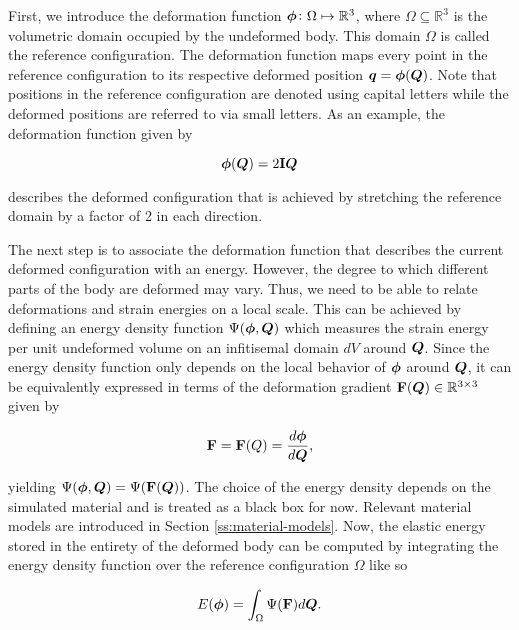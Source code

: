 First, we introduce the deformation function $\bm{\phi} \colon \Omega \mapsto \mathbb{R}^3$, where $\Omega \subseteq \mathbb{R}^3$ is the 
volumetric domain occupied by the undeformed body. This domain $\Omega$ is called the reference configuration. The deformation 
function maps every point in the reference configuration 
to its respective deformed position $\bm{q} = \bm{\phi}(\bm{Q})$. Note that positions in the reference configuration are denoted using capital 
letters while the deformed positions are referred to via small letters. As an example, the deformation function given by 

\[
    \bm{\phi}(\bm{Q}) = 2\mathbf{I}\bm{Q}
\]

\noindent describes the deformed configuration that is achieved by stretching the reference domain by a factor of 2 in each direction. 

The next step is to associate the deformation function that describes the current deformed configuration with an energy. However, the degree to 
which different parts of the body are deformed may vary. Thus, we need to be able to relate deformations and strain energies on a local scale. 
This can be achieved by defining an energy density function $\Psi(\bm{\phi}, \bm{Q})$ which measures the strain energy per unit undeformed volume 
on an infitisemal domain $dV$ around $\bm{Q}$. Since the energy density function only depends on the local behavior of $\bm{\phi}$ around 
$\bm{Q}$, it can be equivalently expressed in terms of the deformation gradient $\mathbf{F}(\bm{Q}) \in \mathbb{R}^{3 \times 3}$ given by 

\begin{equation}\label{eq:deformation-gradient}
    \mathbf{F} = \mathbf{F}(Q) = \frac{d\bm{\phi}}{d\bm{Q}},
\end{equation}

\noindent yielding $\Psi(\bm{\phi}, \bm{Q}) = \Psi(\mathbf{F}(\bm{Q}))$. The choice of the energy density depends on the simulated material and 
is treated as a black box for now. Relevant material models are introduced in Section \ref{ss:material-models}. Now, the elastic energy stored in the 
entirety of the deformed body can be computed by integrating the energy density function over the reference configuration $\Omega$ like so

\begin{equation}\label{eq:elastic-energy}
    E(\bm{\phi}) = \int_{\Omega}\Psi(\mathbf{F}) d\bm{Q}.
\end{equation}

